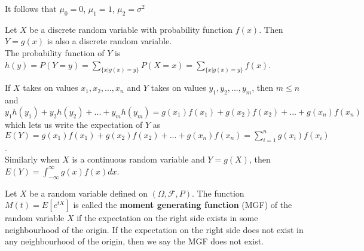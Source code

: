 It follows that $\mu_0 = 0$, $\mu_1 = 1$, $\mu_2 = \sigma ^2$

\begin{samepage}
\begin{thm}
    Let $X$ be a discrete random variable with probability function $f(x)$. Then $Y = g(x)$ is also a discrete random variable. \\ The probability function of $Y$ is $h(y) = P(Y = y) = \sum_{ \{x | g(x) = y \} } P(X = x) = \sum_{ \{x | g(x) = y \} } f(x)$.

    If $X$ takes on values $x_1, x_2, ..., x_n$  and $Y$ takes on values $y_1, y_2, ..., y_m$, then $m \leq n$ and $y_1 h(y_1) + y_2 h(y_2) + ... + y_m h(y_m) = g(x_1) f(x_1) + g(x_2) f(x_2) + ... + g(x_n) f(x_n)$ which lets us write the expectation of $Y$ as \\ $E(Y) = g(x_1)f(x_1) + g(x_2)f(x_2) + ... + g(x_n)f(x_n) = \sum_{i=1}^n g(x_i)f(x_i)$.
    \\ 

    Similarly when $X$ is a continuous random variable and $Y=g(X)$, then $E(Y) = \int_{- \infty}^{\infty} g(x) f(x) dx$.
\end{thm}
\end{samepage}

\begin{defn}
    Let $X$ be a random variable defined on $\left (\Omega,  \mathcal{F}, P\right )$. The function $M\left (t\right ) = E\left [e ^{t X}\right ]$ is called the \textbf{moment generating function} (MGF) of the random variable $X$ if the expectation on the right side exists in some neighbourhood of the origin. If the expectation on the right side does not exist in any neighbourhood of the origin, then we say the MGF does not exist.
\end{defn}

